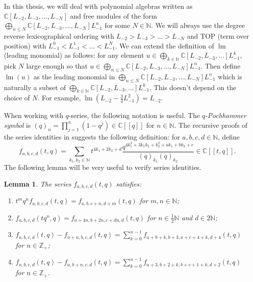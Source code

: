 \documentclass[a4paper, 12pt, reqno]{amsart}
\newtheorem{lemma}[theorem]{Lemma}
\theoremstyle{remark}
\numberwithin{equation}{subsection}
\DeclareMathOperator{\lm}{lm}
\begin{document}
In this thesis, we will deal with polynomial algebras written as $\mathbb{C}[L_{-2}, L_{-3}, \dots, L_{-N}]$ and free modules of the form $\bigoplus_{n \le N}\mathbb{C}[L_{-2}, L_{-3}, \dots, L_{-N}]L_{-1}^n$ for some $N \in \mathbb{N}$.
We will always use the degree reverse lexicographical ordering with $L_{-2} > L_{-3} > \dots > L_{-N}$ and TOP (term over position) with $L_{-1}^0 < L_{-1}^1 < \dots < L_{-1}^N$.
We can extend the definition of $\lm$ (leading monomial) as follows: for any element $u \in \bigoplus_{k \in \mathbb{N}}\mathbb{C}[L_{-2}, L_{-3}, \dots]L_{-1}^k$, pick $N$ large enough so that $u \in \bigoplus_{n \le N}\mathbb{C}[L_{-2}, L_{-3}, \dots, L_{-N}]L_{-1}^n$.
Then define $\lm(u)$ as the leading monomial in $\bigoplus_{n \le N}\mathbb{C}[L_{-2}, L_{-3}, \dots, L_{-N}]L_{-1}^n$ which is naturally a subset of $\bigoplus_{k \in \mathbb{N}}\mathbb{C}[L_{-2}, L_{-3}, \dots]L_{-1}^k$.
This doesn't depend on the choice of $N$.
For example, $\lm(L_{-2} - \frac{3}{4}L_{-1}^2) = L_{-2}$.

When working with $q$-series, the following notation is useful.
The \emph{$q$-Pochhammer symbol} is $(q)_n = \prod_{j = 1}^n(1 - q^j) \in \mathbb{C}[[q]]$ for $n \in \mathbb{N}$.
The recursive proofs of the series identities in \cite{andrews_singular_2022} suggests the following definition: for $a, b, c, d \in \mathbb{N}$, define
\begin{equation*}
  f_{a, b, c, d}(t, q) = \sum_{k_1, k_2 \in \mathbb{N}}t^{4k_1 + 2k_2 + d}\frac{q^{4k_1^2 + 3k_1k_2 + k_2^2 + ak_1 + bk_2 + c}}{(q)_{k_1}(q)_{k_2}} \in \mathbb{C}[[t, q]].
\end{equation*}
The following lemma will be very useful to verify series identities.

\begin{lemma}
  \label{lmm:20}
  The series $f_{a, b, c, d}(t, q)$ satisfies:
  \begin{enumerate}
  \item $t^mq^nf_{a, b, c, d}(t, q) = f_{a, b, c + n, d + m}(t, q)$ for $m, n \in \mathbb{N}$;
  \item $f_{a, b, c, d}(tq^n, q) = f_{a + 4n, b + 2n, c + dn, d}(t, q)$ for $n \in \frac{1}{2}\mathbb{N}$ and $d \in 2\mathbb{N}$;
  \item $f_{a, b, c, d}(t, q) - f_{a + n, b, c, d}(t, q) = \sum_{k = 0}^{n - 1}f_{a + 8 + k, b + 3, a + c + 4 + k, d + 4}(t, q)$ for $n \in \mathbb{Z}_+$;
  \item $f_{a, b, c, d}(t, q) - f_{a, b + n, c, d}(t, q) = \sum_{k = 0}^{n - 1}f_{a + 3, b + 2 + k, b + c + 1 + k, d + 2}(t, q)$ for $n \in \mathbb{Z}_+$.
  \end{enumerate}
\end{lemma}
\end{document}
